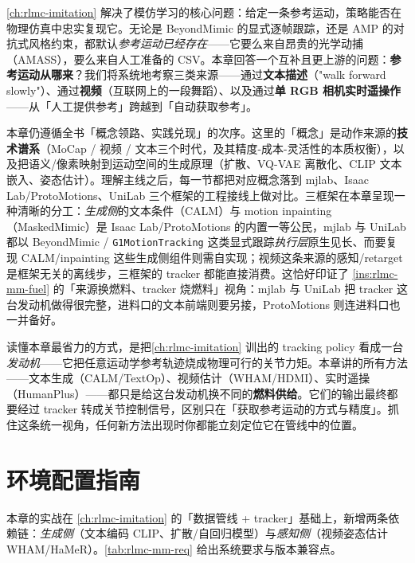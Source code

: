 \cref{ch:rlmc-imitation} 解决了模仿学习的核心问题：给定一条参考运动，策略能否在物理仿真中忠实复现它。无论是 BeyondMimic 的显式逐帧跟踪，还是 AMP 的对抗式风格约束，都默认\emph{参考运动已经存在}——它要么来自昂贵的光学动捕（AMASS），要么来自人工准备的 CSV。本章回答一个互补且更上游的问题：\textbf{参考运动从哪来}？我们将系统地考察三类来源——通过\textbf{文本描述}（"walk forward slowly"）、通过\textbf{视频}（互联网上的一段舞蹈）、以及通过\textbf{单 RGB 相机实时遥操作}——从「人工提供参考」跨越到「自动获取参考」。

本章仍遵循全书「概念领路、实践兑现」的次序。这里的「概念」是动作来源的\textbf{技术谱系}（MoCap / 视频 / 文本三个时代，及其精度-成本-灵活性的本质权衡），以及把语义/像素映射到运动空间的生成原理（扩散、VQ-VAE 离散化、CLIP 文本嵌入、姿态估计）。理解主线之后，每一节都把对应概念落到 mjlab、Isaac Lab/ProtoMotions、UniLab 三个框架的工程接线上做对比。三框架在本章呈现一种清晰的分工：\emph{生成侧}的文本条件（CALM）与 motion inpainting（MaskedMimic）是 Isaac Lab/ProtoMotions 的内置一等公民，mjlab 与 UniLab 都以 BeyondMimic / \verb|G1MotionTracking| 这类显式跟踪\emph{执行层}原生见长、而要复现 CALM/inpainting 这些生成侧组件则需自实现；视频这条来源的感知/retarget 是框架无关的离线步，三框架的 tracker 都能直接消费。这恰好印证了 \cref{ins:rlmc-mm-fuel} 的「来源换燃料、tracker 烧燃料」视角：mjlab 与 UniLab 把 tracker 这台发动机做得很完整，进料口的文本前端则要另接，ProtoMotions 则连进料口也一并备好。

\begin{insight}\label{ins:rlmc-mm-fuel}
读懂本章最省力的方式，是把\cref{ch:rlmc-imitation} 训出的 tracking policy 看成一台\emph{发动机}——它把任意运动学参考轨迹烧成物理可行的关节力矩。本章讲的所有方法——文本生成（CALM/TextOp）、视频估计（WHAM/HDMI）、实时遥操（HumanPlus）——都只是给这台发动机换不同的\textbf{燃料供给}。它们的输出最终都要经过 tracker 转成关节控制信号，区别只在「获取参考运动的方式与精度」。抓住这条统一视角，任何新方法出现时你都能立刻定位它在管线中的位置。
\end{insight}

\section*{环境配置指南}
\label{sec:rlmc-mm-setup}

本章的实战在 \cref{ch:rlmc-imitation} 的「数据管线 + tracker」基础上，新增两条依赖链：\emph{生成侧}（文本编码 CLIP、扩散/自回归模型）与\emph{感知侧}（视频姿态估计 WHAM/HaMeR）。\cref{tab:rlmc-mm-req} 给出系统要求与版本兼容点。

